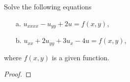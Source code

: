 \begin{problem}{2.54}
  Solve the following equations
  \begin{enumerate}
    \item[a.] $u_{xxxx} - u_{yy} + 2u = f(x,y)$,
    \item[b.] $u_{xx} + 2u_{yy} + 3 u_{x} -4u = f(x, y)$,
  \end{enumerate}
  where $f(x, y)$ is a given function.
\end{problem}

\begin{proof}
\end{proof}
\newpage

